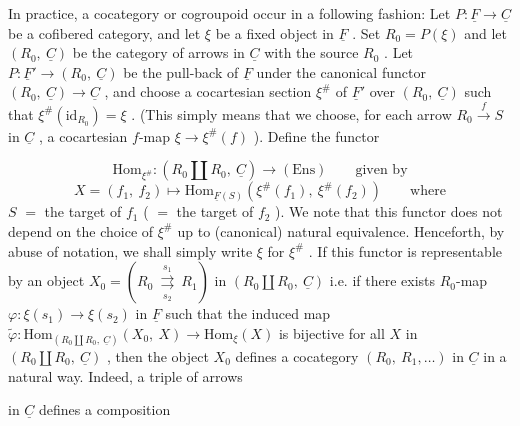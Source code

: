 In practice, a cocategory or cogroupoid occur in a following fashion: Let $P : \underline{F} \to \underline{C}$ be a cofibered category, and let $\xi$ be a fixed object in $\underline{F}$ . Set $R_0 = P(\xi)$ and let $(R_0,\ \underline{C})$ be the category of arrows in $\underline{C}$ with the source $R_0$ . Let $P : \underline{F}' \to (R_0,\ \underline{C})$ be the pull-back of $\underline{F}$ under the canonical functor $(R_0,\ \underline{C}) \to \underline{C}$ , and choose a cocartesian section $\xi^{\#}$ of $\underline{F}'$ over $(R_0,\ \underline{C})$ such that $\xi^{\#}(\mathrm{id}_{R_0}) = \xi$ . (This simply means that we choose, for each arrow $R_0 \xrightarrow{f} S$ in $\underline{C}$ , a cocartesian $f$-map $\xi \to \xi^{\#}(f)$ ). Define the functor

\begin{equation*}
\mathrm{Hom}_{\xi^{\#}} : (R_0 \amalg R_0,\ \underline{C}) \to (\mathrm{Ens}) \qquad \text{given by}
\end{equation*}
\begin{equation*}
X = (f_1,\ f_2) \longmapsto \mathrm{Hom}_{\underline{F}(S)}(\xi^{\#}(f_1),\ \xi^{\#}(f_2)) \qquad \text{where}
\end{equation*}
$S$ $=$ the target of $f_1$ ( $=$ the target of $f_2$ ). We note that this functor does not depend on the choice of $\xi^{\#}$ up to (canonical) natural equivalence. Henceforth, by abuse of notation, we shall simply write $\xi$ for $\xi^{\#}$ . If this functor is representable by an object $X_0 = (R_0 \ \overset{s_1}{\underset{s_2}{\rightrightarrows}}\ R_1)$ in $(R_0 \amalg R_0,\ \underline{C})$ i.e. if there exists $R_0$-map $\varphi : \xi(s_1) \to \xi(s_2)$ in $\underline{F}$ such that the induced map $\widetilde{\varphi} : \mathrm{Hom}_{(R_0 \amalg R_0,\ \underline{C})}(X_0,\ X) \to \mathrm{Hom}_{\xi}(X)$ is bijective for all $X$ in $(R_0 \amalg R_0,\ \underline{C})$ , then the object $X_0$ defines a cocategory $(R_0,\ R_1,\ldots)$ in $\underline{C}$ in a natural way. Indeed, a triple of arrows
in $\underline{C}$ defines a composition

